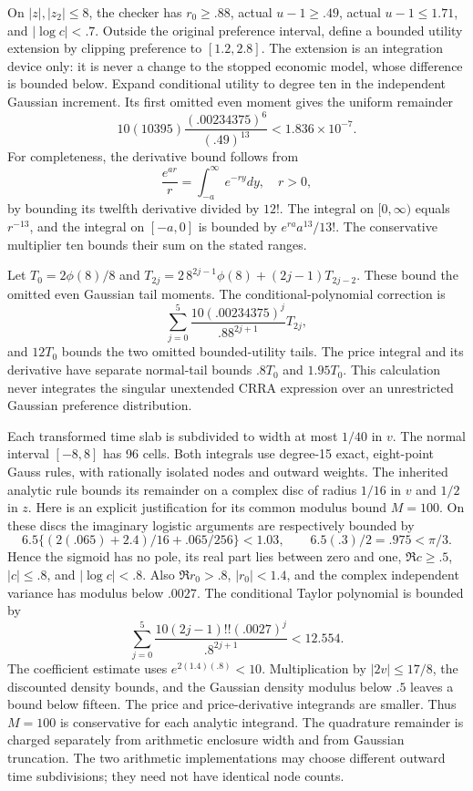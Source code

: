 On $|z|,|z_2|\leq8$, the checker has $r_0\geq.88$, actual $u-1\geq.49$, actual $u-1\leq1.71$, and $|\log c|<.7$. Outside the original preference interval, define a bounded utility extension by clipping preference to $[1.2,2.8]$. The extension is an integration device only: it is never a change to the stopped economic model, whose difference is bounded below. Expand conditional utility to degree ten in the independent Gaussian increment. Its first omitted even moment gives the uniform remainder
\[
 10(10395)\frac{(.00234375)^6}{(.49)^{13}}<1.836\times10^{-7}.
\]
For completeness, the derivative bound follows from
\[
 \frac{e^{ar}}r=\int_{-a}^{\infty}e^{-ry}dy,
 \quad r>0,
\]
by bounding its twelfth derivative divided by $12!$. The integral on $[0,\infty)$ equals $r^{-13}$, and the integral on $[-a,0]$ is bounded by $e^{ra}a^{13}/13!$. The conservative multiplier ten bounds their sum on the stated ranges.

Let $T_0=2\phi(8)/8$ and $T_{2j}=2\,8^{2j-1}\phi(8)+(2j-1)T_{2j-2}$. These bound the omitted even Gaussian tail moments. The conditional-polynomial correction is
\[
 \sum_{j=0}^{5}\frac{10(.00234375)^j}{.88^{2j+1}}T_{2j},
\]
and $12T_0$ bounds the two omitted bounded-utility tails. The price integral and its derivative have separate normal-tail bounds $.8T_0$ and $1.95T_0$. This calculation never integrates the singular unextended CRRA expression over an unrestricted Gaussian preference distribution.

Each transformed time slab is subdivided to width at most $1/40$ in $v$. The normal interval $[-8,8]$ has 96 cells. Both integrals use degree-15 exact, eight-point Gauss rules, with rationally isolated nodes and outward weights. The inherited analytic rule bounds its remainder on a complex disc of radius $1/16$ in $v$ and $1/2$ in $z$. Here is an explicit justification for its common modulus bound $M=100$. On these discs the imaginary logistic arguments are respectively bounded by
\[
 6.5\{(2(.065)+2.4)/16+.065/256\}<1.03,
 \qquad 6.5(.3)/2=.975<\pi/3.
\]
Hence the sigmoid has no pole, its real part lies between zero and one, $\Re c\geq.5$, $|c|\leq.8$, and $|\log c|<.8$. Also $\Re r_0>.8$, $|r_0|<1.4$, and the complex independent variance has modulus below $.0027$. The conditional Taylor polynomial is bounded by
\[
 \sum_{j=0}^{5}\frac{10(2j-1)!!(.0027)^j}{.8^{2j+1}}<12.554.
\]
The coefficient estimate uses $e^{2(1.4)(.8)}<10$. Multiplication by $|2v|\leq17/8$, the discounted density bounds, and the Gaussian density modulus below $.5$ leaves a bound below fifteen. The price and price-derivative integrands are smaller. Thus $M=100$ is conservative for each analytic integrand. The quadrature remainder is charged separately from arithmetic enclosure width and from Gaussian truncation. The two arithmetic implementations may choose different outward time subdivisions; they need not have identical node counts.

